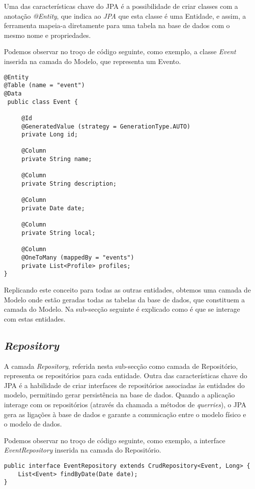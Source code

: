 Uma das características chave do JPA é a possibilidade de criar classes com a anotação \emph{@Entity}, que indica ao \emph{JPA} que esta classe é uma Entidade, e assim, a ferramenta mapeia-a diretamente para uma tabela na base de dados com o mesmo nome e propriedades.

Podemos observar no troço de código seguinte, como exemplo, a classe \emph{Event} inserida na camada do Modelo, que representa um Evento.


\begin{lstlisting}
@Entity 
@Table (name = "event")
@Data 
 public class Event {

	 @Id
	 @GeneratedValue (strategy = GenerationType.AUTO)
	 private Long id;
	
	 @Column
	 private String name;
	
	 @Column 
	 private String description;
	
	 @Column 
	 private Date date;
	
	 @Column 
	 private String local;
	
	 @Column 
	 @OneToMany (mappedBy = "events")
	 private List<Profile> profiles;
}
\end{lstlisting}


Replicando este conceito para todas as outras entidades, obtemos uma camada de Modelo onde estão geradas todas as tabelas da base de dados, que constituem a camada do Modelo. Na sub-secção seguinte é explicado como é que se interage com estas entidades.

\subsection{\emph{Repository}} \label{sec312}
A camada \emph{Repository}, referida nesta sub-secção como camada de Repositório, representa os repositórios para cada entidade. 
Outra das características chave do JPA é a habilidade de criar interfaces de repositórios associadas às entidades do modelo, permitindo gerar persistência na base de dados. Quando a aplicação interage com os repositórios (através da chamada a métodos de \emph{querries}), o JPA gera as ligações à base de dados e garante a comunicação entre o modelo físico e o modelo de dados.

Podemos observar no troço de código seguinte, como exemplo, a interface \emph{EventRepository} inserida na camada do Repositório.

\begin{lstlisting}
public interface EventRepository extends CrudRepository<Event, Long> {
	List<Event> findByDate(Date date);
}
\end{lstlisting}

